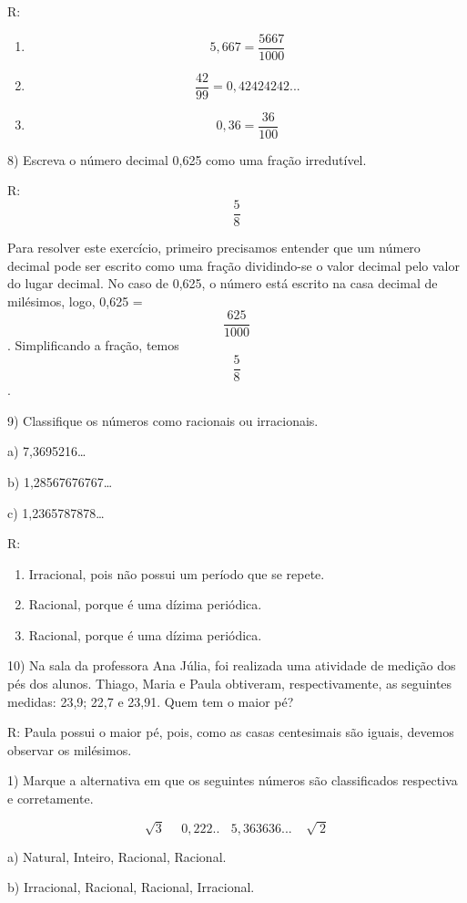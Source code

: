 R:~~~~~~~~

\begin{enumerate}
\def\labelenumi{\alph{enumi})}
\item
  \[5,667 = \frac{5667}{1000}\]
\item
  \[\frac{42}{99} = 0,42424242...\]
\item
  \[0,36 = \frac{36}{100}\]
\end{enumerate}

8) Escreva o número decimal 0,625 como uma fração irredutível.

R: \[\frac{5}{8}\]

Para resolver este exercício, primeiro precisamos entender que um número
decimal pode ser escrito como uma fração dividindo-se o valor decimal
pelo valor do lugar decimal. No caso de 0,625, o número está escrito na
casa decimal de milésimos, logo, 0,625 = \[\frac{625}{1000}\].
Simplificando a fração, temos \[\frac{5}{8}\].

9) Classifique os números como racionais ou irracionais.

a) 7,3695216\ldots{}

b) 1,28567676767\ldots{}

c) 1,2365787878\ldots{}

R:

\begin{enumerate}
\def\labelenumi{\alph{enumi})}
\item
  Irracional, pois não possui um período que se repete.
\item
  Racional, porque é uma dízima periódica.
\item
  Racional, porque é uma dízima periódica.
\end{enumerate}

10) Na sala da professora Ana Júlia, foi realizada uma atividade de
medição dos pés dos alunos. Thiago, Maria e Paula obtiveram,
respectivamente, as seguintes medidas: 23,9; 22,7 e 23,91. Quem tem o
maior pé?

R: Paula possui o maior pé, pois, como as casas centesimais são iguais,
devemos observar os milésimos.


1) Marque a alternativa em que os seguintes números são classificados
respectiva e corretamente.

\[\sqrt{3}\ \ \ \ \ \ 0,222..\ \ \ \ 5,363636...\ \ \ \ \ \sqrt{\ 2}\]

a) Natural, Inteiro, Racional, Racional.

b) Irracional, Racional, Racional, Irracional.

